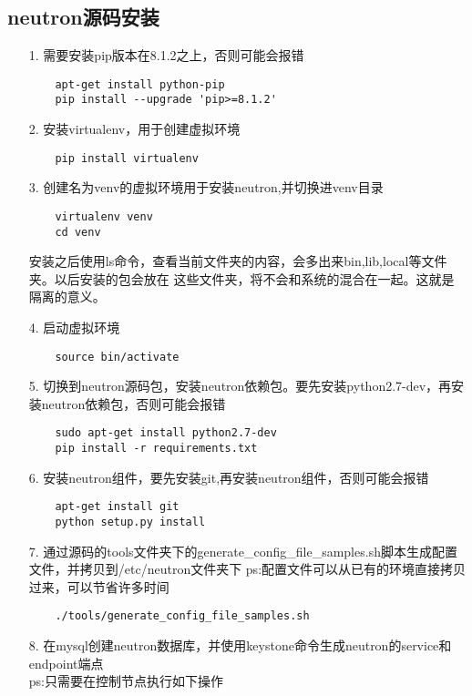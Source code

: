\documentclass[a4paper,left=1.5cm,right=1.5cm,11pt]{article}
\begin{document}
\subsection{neutron源码安装}
\begin{itemize}
	\item[1.]需要安装pip版本在8.1.2之上，否则可能会报错
	\begin{lstlisting}
	apt-get install python-pip
	pip install --upgrade 'pip>=8.1.2'
	\end{lstlisting}
	\item[2.]安装virtualenv，用于创建虚拟环境
	\begin{lstlisting}
	pip install virtualenv
	\end{lstlisting}
	\item[3.]创建名为venv的虚拟环境用于安装neutron,并切换进venv目录
	\begin{lstlisting}
	virtualenv venv
	cd venv
	\end{lstlisting}
	安装之后使用ls命令，查看当前文件夹的内容，会多出来bin,lib,local等文件夹。以后安装的包会放在
	这些文件夹，将不会和系统的混合在一起。这就是隔离的意义。
	\item[4.]启动虚拟环境
	\begin{lstlisting}
	source bin/activate
	\end{lstlisting}
    \item[5.]切换到neutron源码包，安装neutron依赖包。要先安装python2.7-dev，再安装neutron依赖包，否则可能会报错
	\begin{lstlisting}
	sudo apt-get install python2.7-dev
	pip install -r requirements.txt
	\end{lstlisting}
	\item[6.]安装neutron组件，要先安装git,再安装neutron组件，否则可能会报错
	\begin{lstlisting}
	apt-get install git
	python setup.py install
	\end{lstlisting}
	\item[7.]通过源码的tools文件夹下的generate\_config\_file\_samples.sh脚本生成配置文件，并拷贝到/etc/neutron文件夹下
	ps:配置文件可以从已有的环境直接拷贝过来，可以节省许多时间
	\begin{lstlisting}
	./tools/generate_config_file_samples.sh
	\end{lstlisting}	
	\item[8.]在mysql创建neutron数据库，并使用keystone命令生成neutron的service和endpoint端点\\
	ps:只需要在控制节点执行如下操作
	\begin{lstlisting}

\end{lstlisting}
\end{itemize}
\end{document}
